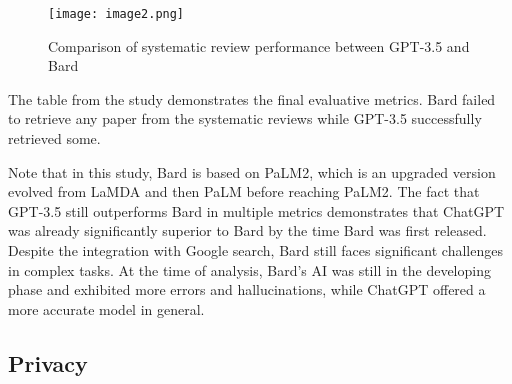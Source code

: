 \begin{figure}[h]
    \centering
    \texttt{[image: image2.png]}
    \caption{Comparison of systematic review performance between GPT-3.5 and Bard}
    \label{fig:image2}
\end{figure}

The table from the study demonstrates the final evaluative metrics. Bard failed to retrieve any paper from the systematic reviews while GPT-3.5 successfully retrieved some.

Note that in this study, Bard is based on PaLM2, which is an upgraded version evolved from LaMDA and then PaLM before reaching PaLM2. The fact that GPT-3.5 still outperforms Bard in multiple metrics demonstrates that ChatGPT was already significantly superior to Bard by the time Bard was first released. Despite the integration with Google search, Bard still faces significant challenges in complex tasks. At the time of analysis, Bard's AI was still in the developing phase and exhibited more errors and hallucinations, while ChatGPT offered a more accurate model in general.


\subsection{Privacy}

